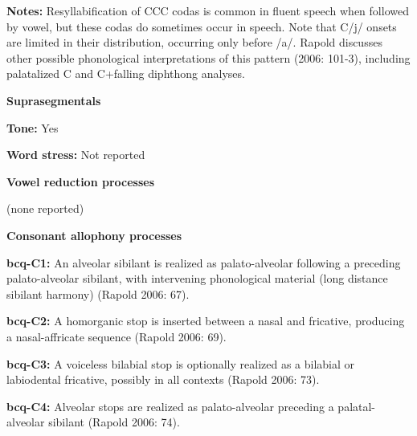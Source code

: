 \begin{styleBody}
\textbf{Notes:} Resyllabification of CCC codas is common in fluent speech when followed by vowel, but these codas do sometimes occur in speech. Note that C/j/ onsets are limited in their distribution, occurring only before /a/. Rapold discusses other possible phonological interpretations of this pattern (2006: 101-3), including palatalized C and C+falling diphthong analyses.
\end{styleBody}

\begin{styleBody}
\textbf{Suprasegmentals}
\end{styleBody}

\begin{styleBody}
\textbf{Tone:} Yes
\end{styleBody}

\begin{styleBody}
\textbf{Word stress: }Not reported
\end{styleBody}

\begin{styleBody}
\textbf{Vowel reduction processes}
\end{styleBody}

\begin{styleBody}
(none reported)
\end{styleBody}

\begin{styleBody}
\textbf{Consonant allophony processes}
\end{styleBody}

\begin{styleBody}
\textbf{bcq-C1: }An alveolar sibilant is realized as palato-alveolar following a preceding palato-alveolar sibilant, with intervening phonological material (long distance sibilant harmony) (Rapold 2006: 67).
\end{styleBody}

\begin{styleBody}
\textbf{bcq-C2: }A homorganic stop is inserted between a nasal and fricative, producing a nasal-affricate sequence (Rapold 2006: 69).
\end{styleBody}

\begin{styleBody}
\textbf{bcq-C3: }A voiceless bilabial stop is optionally realized as a bilabial or labiodental fricative, possibly in all contexts (Rapold 2006: 73).
\end{styleBody}

\begin{styleBody}
\textbf{bcq-C4: }Alveolar stops are realized as palato-alveolar preceding a palatal-alveolar sibilant (Rapold 2006: 74).
\end{styleBody}

